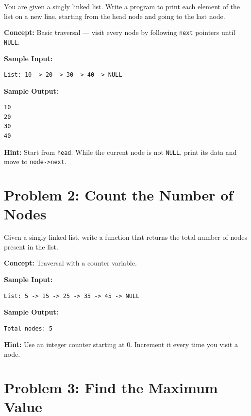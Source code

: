\documentclass[12pt, a4paper]{article}
\begin{document}
\begin{problembox}
You are given a singly linked list. Write a program to print each element of the list on a new line, starting from the head node and going to the last node.
\end{problembox}

\textbf{Concept:} Basic traversal --- visit every node by following \texttt{next} pointers until \texttt{NULL}.

\textbf{Sample Input:}
\begin{lstlisting}
List: 10 -> 20 -> 30 -> 40 -> NULL
\end{lstlisting}

\textbf{Sample Output:}
\begin{lstlisting}
10
20
30
40
\end{lstlisting}

\textbf{Hint:} Start from \texttt{head}. While the current node is not \texttt{NULL}, print its data and move to \texttt{node->next}.

\hrulefill

\section*{Problem 2: Count the Number of Nodes}

\begin{problembox}
Given a singly linked list, write a function that returns the total number of nodes present in the list.
\end{problembox}

\textbf{Concept:} Traversal with a counter variable.

\textbf{Sample Input:}
\begin{lstlisting}
List: 5 -> 15 -> 25 -> 35 -> 45 -> NULL
\end{lstlisting}

\textbf{Sample Output:}
\begin{lstlisting}
Total nodes: 5
\end{lstlisting}

\textbf{Hint:} Use an integer counter starting at 0. Increment it every time you visit a node.

\hrulefill

\section*{Problem 3: Find the Maximum Value}
\end{document}
